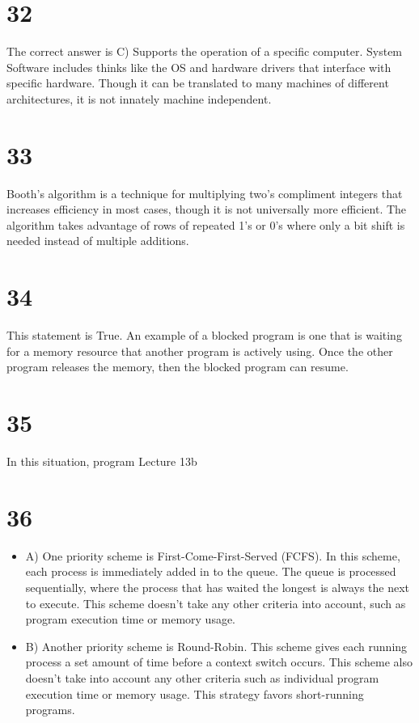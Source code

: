 \documentclass[a4paper,11pt]{article}
\begin{document}

\section*{32}
The correct answer is C) Supports the operation of a specific computer.  System Software includes thinks like the OS and hardware drivers that interface with specific hardware.  Though it can be translated to many machines of different architectures, it is not innately machine independent.  


\section*{33}
Booth's algorithm is a technique for multiplying two's compliment integers that increases efficiency in most cases, though it is not universally more efficient.  The algorithm takes advantage of rows of repeated 1's or 0's where only a bit shift is needed instead of multiple additions.  


\section*{34}
This statement is True.  An example of a blocked program is one that is waiting for a memory resource that another program is actively using.  Once the other program releases the memory, then the blocked program can resume.


\section*{35}
In this situation, program  Lecture 13b


\section*{36}
\begin{itemize}
  \item A) One priority scheme is First-Come-First-Served (FCFS).  In this scheme, each process is immediately added in to the queue.  The queue is processed sequentially, where the process that has waited the longest is always the next to execute.  This scheme doesn't take any other criteria into account, such as program execution time or memory usage.
  \item B) Another priority scheme is Round-Robin.  This scheme gives each running process a set amount of time before a context switch occurs.  This scheme also doesn't take into account any other criteria such as individual program execution time or memory usage.  This strategy favors short-running programs.
\end{itemize}
\end{document}
